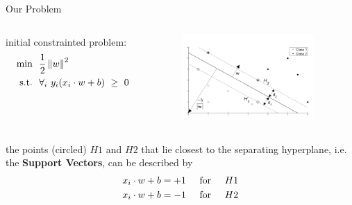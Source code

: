 \begin{frame}[fragile]{Our Problem}
  \begin{columns}[onlytextwidth, T, c]
    \begin{column}{.5\textwidth}
      initial constrainted problem:
      \newline
      \begin{equation*}
        \begin{split}
          \text{min}\ &\ \frac{1}{2} \norm{w}^2 \\
          \text{s.t.}\ &\ \forall_{i}\ y_i (x_i \cdot w + b)\ \geq\ 0
        \end{split}
      \end{equation*}
    \end{column}
    \begin{column}{.5\textwidth}
        \begin{figure}
          \centering    
          \includegraphics[width=5cm]{assets/images/s1.01.png}
        \end{figure}
    \end{column}    
  \end{columns}
  
  \vspace{.7cm}
  
  the points (circled) $H1$ and $H2$ that lie closest to the separating hyperplane, 
  i.e. the \textbf{Support Vectors}, can be described by
  \begin{equation*}
    \begin{split}
      x_i \cdot w + b = +1 & \hspace{.5cm} \text{for} \hspace{.5cm} H1 \\
      x_i \cdot w + b = -1 & \hspace{.5cm} \text{for} \hspace{.5cm} H2
    \end{split}
  \end{equation*}

\end{frame}


